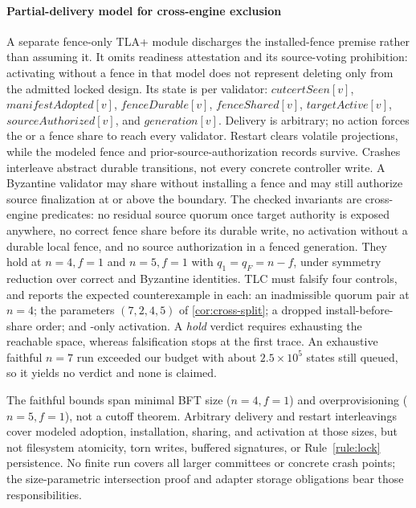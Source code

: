 \paragraph{Partial-delivery model for cross-engine exclusion}
A separate fence-only TLA+ module discharges the installed-fence premise rather than assuming it.
It omits readiness attestation and its source-voting prohibition: activating without a fence in
that model does not represent deleting only \FenceCert{} from the admitted locked design. Its
state is per validator:
$\mathit{cutcertSeen}[v]$, $\mathit{manifestAdopted}[v]$, $\mathit{fenceDurable}[v]$,
$\mathit{fenceShared}[v]$, $\mathit{targetActive}[v]$, $\mathit{sourceAuthorized}[v]$, and
$\mathit{generation}[v]$. Delivery is arbitrary; no action forces the \CutCert{} or a fence share
to reach every validator. Restart clears volatile projections, while the modeled fence and
prior-source-authorization records survive. Crashes interleave abstract durable transitions,
not every concrete controller write. A Byzantine validator may share without installing a fence
and may still authorize source finalization at or above the boundary. The checked invariants are
cross-engine predicates: no residual source quorum once target authority is exposed anywhere, no
correct fence share before its durable write, no activation without a durable local fence, and no
source authorization in a fenced generation. They hold at $n=4,f=1$ and $n=5,f=1$ with $q_1=q_F=n-f$,
under symmetry reduction over correct and Byzantine identities. TLC must falsify four controls, and
reports the expected counterexample in each: an inadmissible quorum pair at $n=4$; the parameters
$(7,2,4,5)$ of \cref{cor:cross-split}; a dropped install-before-share order; and \CutCert-only
activation. A \emph{hold} verdict requires exhausting the reachable space, whereas falsification stops
at the first trace. An exhaustive faithful $n=7$ run exceeded our budget with about $2.5\times10^5$
states still queued, so it yields no verdict and none is claimed.

The faithful bounds span minimal BFT size ($n=4,f=1$) and overprovisioning ($n=5,f=1$), not a
cutoff theorem. Arbitrary delivery and restart interleavings cover modeled adoption,
installation, sharing, and activation at those sizes, but not filesystem atomicity, torn writes,
buffered signatures, or Rule~\ref{rule:lock} persistence. No finite run covers all larger
committees or concrete crash points; the size-parametric intersection proof and adapter storage
obligations bear those responsibilities.

